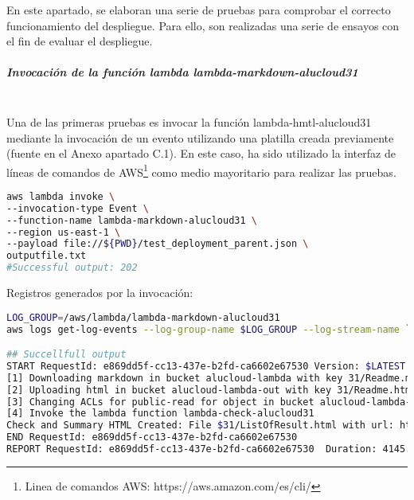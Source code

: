 \documentclass[
]{article}
\begin{document}
En este apartado, se elaboran una serie de pruebas para comprobar el
correcto funcionamiento del despliegue. Para ello, son realizadas una serie de ensayos con el fin de evaluar el despliegue.

\hypertarget{header-n180}{%
\subparagraph{Invocación de la función lambda
lambda-markdown-alucloud31}\label{header-n180}}
\leavevmode
\\
Una de las primeras pruebas es invocar la función lambda-hmtl-alucloud31 mediante la invocación de un evento utilizando una platilla creada previamente (fuente en el Anexo apartado C.1). En este caso, ha sido utilizado la interfaz de líneas de comandos de AWS\footnote{Linea de comandos AWS: https://aws.amazon.com/es/cli/} como medio mayoritario para realizar las pruebas. 
\begin{lstlisting}[language=bash,caption={Comando de invocación mediante plantilla}]
aws lambda invoke \
--invocation-type Event \
--function-name lambda-markdown-alucloud31 \
--region us-east-1 \
--payload file://${PWD}/test_deployment_parent.json \
outputfile.txt
#Successful output: 202
\end{lstlisting}

Registros generados por la invocación:

\begin{lstlisting}[language=bash,caption={Comando para obtener Logs}]
LOG_GROUP=/aws/lambda/lambda-markdown-alucloud31
aws logs get-log-events --log-group-name $LOG_GROUP --log-stream-name `aws logs describe-log-streams --log-group-name $LOG_GROUP --max-items 1 --order-by LastEventTime --descending --query logStreams[].logStreamName --output text | head -n 1` --query events[].message --output text

## Succellfull output
START RequestId: e869dd5f-cc13-437e-b2fd-ca6602e67530 Version: $LATEST
[1] Downloading markdown in bucket alucloud-lambda with key 31/Readme.md
[2] Uploading html in bucket alucloud-lambda-out with key 31/Readme.html
[3] Changing ACLs for public-read for object in bucket alucloud-lambda-out with key 31/Readme.html
[4] Invoke the lambda function lambda-check-alucloud31
Check and Summary HTML Created: File $31/ListOfResult.html with url: https://alucloud-lambda-out.s3.amazonaws.com/31/ListOfResult.html
END RequestId: e869dd5f-cc13-437e-b2fd-ca6602e67530
REPORT RequestId: e869dd5f-cc13-437e-b2fd-ca6602e67530	Duration: 4145.55 ms	Billed Duration: 4146 ms	Memory Size: 128 MB	Max Memory Used: 84 MB	Init Duration: 509.80 ms
\end{lstlisting}
\end{document}
